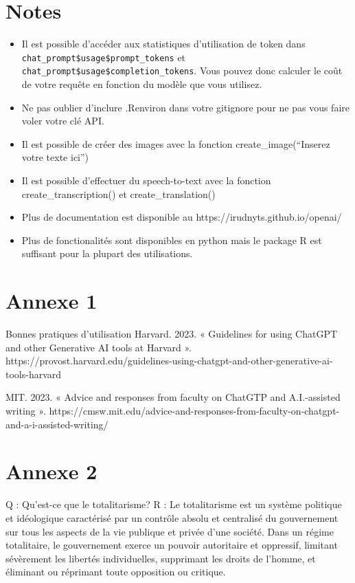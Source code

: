 \documentclass[
  letterpaper,
]{scrbook}
\begin{document}
\hypertarget{notes}{%
\section{Notes}\label{notes}}

\begin{itemize}
\item
  Il est possible d'accéder aux statistiques d'utilisation de token dans
  \texttt{chat\_prompt\$usage\$prompt\_tokens} et
  \texttt{chat\_prompt\$usage\$completion\_tokens}. Vous pouvez donc
  calculer le coût de votre requête en fonction du modèle que vous
  utilisez.
\item
  Ne pas oublier d'inclure .Renviron dans votre gitignore pour ne pas
  vous faire voler votre clé API.
\item
  Il est possible de créer des images avec la fonction
  create\_image(``Inserez votre texte ici'')
\item
  Il est possible d'effectuer du speech-to-text avec la fonction
  create\_transcription() et create\_translation()
\item
  Plus de documentation est disponible au
  https://irudnyts.github.io/openai/
\item
  Plus de fonctionalités sont disponibles en python mais le package R
  est suffisant pour la plupart des utilisations.
\end{itemize}

\hypertarget{annexe-1}{%
\section{Annexe 1}\label{annexe-1}}

Bonnes pratiques d'utilisation Harvard. 2023. « Guidelines for using
ChatGPT and other Generative AI tools at Harvard ».
https://provost.harvard.edu/guidelines-using-chatgpt-and-other-generative-ai-tools-harvard

MIT. 2023. « Advice and responses from faculty on ChatGTP and
A.I.-assisted writing ».
https://cmsw.mit.edu/advice-and-responses-from-faculty-on-chatgpt-and-a-i-assisted-writing/

\hypertarget{annexe-2}{%
\section{Annexe 2}\label{annexe-2}}

Q : Qu'est-ce que le totalitarisme? R : Le totalitarisme est un système
politique et idéologique caractérisé par un contrôle absolu et
centralisé du gouvernement sur tous les aspects de la vie publique et
privée d'une société. Dans un régime totalitaire, le gouvernement exerce
un pouvoir autoritaire et oppressif, limitant sévèrement les libertés
individuelles, supprimant les droits de l'homme, et éliminant ou
réprimant toute opposition ou critique.
\end{document}
